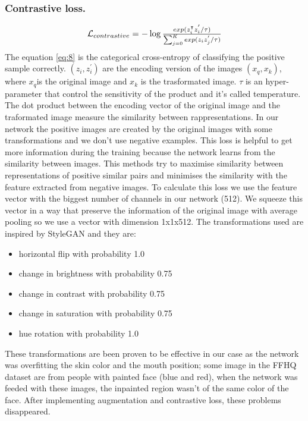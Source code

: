 \documentclass[10pt,twocolumn,letterpaper]{article}
\begin{document}
\subsubsection{Contrastive loss.}
\begin{equation}
    \resizebox{.47 \textwidth}{!}{%
    $\mathcal{L}_{contrastive} = - \log{\frac{exp(z_{i}^\intercal z_{i}^{'}/\tau)}{\sum_{j=0}^{K}exp(z_{i}z_{j}^{'}/\tau)}}
    $%
    }
\end{equation}
The equation \eqref{eq:8} \cite{le2020contrastive} is the categorical cross-entropy of classifying the positive sample correctly\cite{oord2018representation}. \((z_{i}, z_{i}^{'})\) are the encoding version of the images \((x_{q}, x_{k})\), where \(x_{q}\)is the original image and \(x_{k}\) is the trasformated image. \(\tau\) is an hyper-parameter that control the sensitivity of the product and it's called temperature. The dot product between the encoding vector of the original image and the traformated image measure the similarity between rappresentations. In our network the positive images are created by the original images with some transformations and we don't use negative examples.
This loss is helpful to get more information during the training because the network learns from the similarity between images. This methods try to maximise similarity between representations of positive similar pairs and minimises the similarity with the feature extracted from negative images\cite{le2020contrastive}.
To calculate this loss we use the feature vector with the biggest number of channels in our network (512). We squeeze this vector in a way that preserve the information of the original image with average pooling so we use a vector with dimension 1x1x512.
The transformations used are inspired by StyleGAN\cite{karras2020analyzing} and they are:
\begin{itemize}
  \item horizontal flip with probability 1.0
  \item change in brightness with probability 0.75
  \item change in contrast with probability 0.75
  \item change in saturation with probability 0.75
  \item hue rotation with probability 1.0
\end{itemize}
These transformations are been proven to be effective in our case as the network
was overfitting the skin color and the mouth position; some image in the FFHQ
dataset are from people with painted face (blue and red), when the network was
feeded with these images, the inpainted region wasn't of the same color of the
face. After implementing augmentation and contrastive loss, these problems disappeared.
\end{document}
